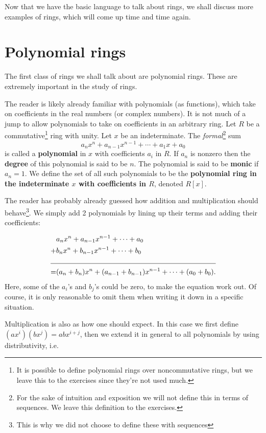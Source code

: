\documentclass[./main.tex]{subfiles}
\begin{document}
Now that we have the basic language to talk about rings, we shall discuss more
examples of rings, which will come up time and time again. 

\section{Polynomial rings}
The first class of rings we shall talk about are polynomial rings. These are
extremely important in the study of rings.

The reader is likely already familiar with polynomials (as functions), which
take on coefficients in the real numbers (or complex numbers). It is not much of
a jump to allow polynomials to take on coefficients in an arbitrary ring. Let
$R$ be a commutative\footnote{It is possible to define polynomial rings over
noncommutative rings, but we leave this to the exercises since they're not used
much.} ring with unity. Let $x$ be an indeterminate. The
\emph{formal}\footnote{For the sake of intuition and exposition we will not
define this in terms of sequences. We leave this definition to the exercises.}
sum 
\[
    a_n x^n + a_{n-1} x^{n-1} + \cdots + a_1 x + a_0
\]
is called a \textbf{polynomial} in $x$ with coefficients $a_i$ in $R$. If $a_n$
is nonzero then the \textbf{degree} of this polynomial is said to be $n$. The
polynomial is said to be \textbf{monic} if $a_n = 1$. We define the set of all
such polynomials to be the \textbf{polynomial ring in the indeterminate $x$ with
coefficients in $R$}, denoted $R[x]$. 

The reader has probably already guessed how addition and multiplication should
behave\footnote{This is why we did not choose to define these with sequences}.
We simply add 2 polynomials by lining up their terms and adding their
coefficients:

\begin{align*}
    &a_n x^n + a_{n-1} x^{n-1} + \cdots + a_0 \\
    + &b_n x^n + b_{n-1} x^{n-1} + \cdots + b_0 \\
    \cline{1-2} 
    = &(a_n + b_n) x^n + (a_{n-1} + b_{n-1}) x^{n-1} + \cdots + (a_0 + b_0).
\end{align*}
Here, some of the $a_i$'s and $b_j$'s could be zero, to make the equation work
out. Of course, it is only reasonable to omit them when writing it down in a
specific situation.

Multiplication is also as how one should expect. In this case we first define
$(a x^i)(b x^j) = ab x^{i+j}$, then we extend it in general to all polynomials
by using distributivity, i.e.
\end{document}
